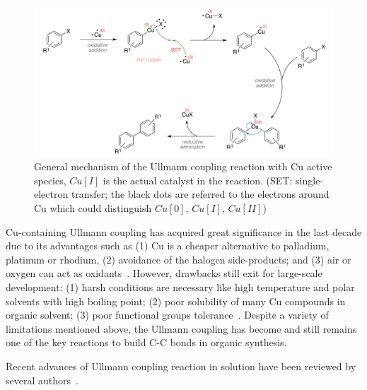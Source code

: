 \documentclass[%
 reprint,
 amsmath,amssymb,
 aps,
prb,
]{revtex4-2}
\begin{document}
\begin{figure}[htb]
\centering
\includegraphics[width=0.90\columnwidth]{Fig/classical-mechanism.png}
\caption{General mechanism of the Ullmann coupling reaction with Cu active species, $Cu[I]$ is the actual catalyst in the reaction. (SET: single-electron transfer; the black dots are referred to the electrons around Cu which could distinguish $Cu[0]$, $Cu[I]$, $Cu[II]$)}
\label{fig:classical}
\end{figure}
Cu-containing Ullmann coupling has acquired great significance in the last decade due to its advantages such as (1) Cu is a cheaper alternative to palladium, platinum or rhodium,  (2) avoidance of the halogen side-products; and (3) air or oxygen can act as oxidants~\cite{ullmann_38,ullmann_39,ullmann_40,ullmann_41}. However, drawbacks still exit for large-scale development: (1) harsh conditions are necessary like high temperature and polar solvents with high boiling point; (2) poor solubility of many Cu compounds in organic solvent; (3) poor functional groups tolerance~\cite{ullmann_31}. Despite a variety of limitations mentioned above, the Ullmann coupling has become and still remains one of the key reactions to build C-C bonds in organic synthesis. 

Recent advances of Ullmann coupling reaction in solution have been reviewed by several authors~\cite{ullmann_29,ullmann_30,ullmann_31,ullmann_32}.
\end{document}
